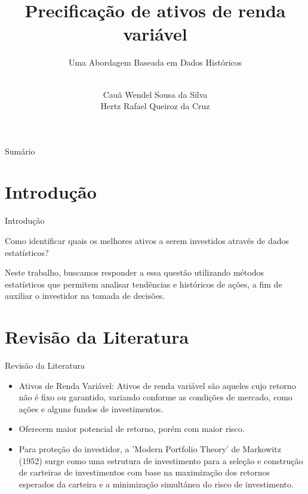 \documentclass[aspectratio=169]{beamer}
\title{Precificação de ativos de renda variável}
\subtitle{Uma Abordagem Baseada em Dados Históricos}
\author{\\Cauã Wendel Sousa da Silva \\ Hertz Rafael Queiroz da Cruz}
\begin{document}
\begin{frame}
  \maketitle
\end{frame}


\begin{frame}{Sumário}
  \tableofcontents
\end{frame}

\section{Introdução}
\begin{frame}{Introdução}

  \begin{center}
    {\Large Como identificar quais os melhores ativos a serem investidos através de dados estatísticos?}

    
  \end{center}

  \vspace{0.5cm}
Neste trabalho, buscamos responder a essa questão utilizando métodos estatísticos que permitem analisar tendências e históricos de ações, a fim de auxiliar o investidor na tomada de decisões.


  
\end{frame}

\section{Revisão da Literatura}
\begin{frame}{Revisão da Literatura}
  \begin{itemize}
    \item Ativos de Renda Variável: Ativos de renda variável são aqueles cujo retorno não é fixo ou garantido, variando conforme as condições de mercado, como ações e alguns fundos de investimentos.

    \item Oferecem maior potencial de retorno, porém com maior risco.

    \item Para proteção do investidor, a 'Modern Portfolio Theory'
    de Markowitz (1952) surge como uma estrutura de investimento para a seleção e
    construção de carteiras de investimentos com base na maximização dos retornos esperados da carteira e a minimização simultânea do risco de investimento. \cite{mangram2013simplified}

  \end{itemize}
\end{frame}
\end{document}

